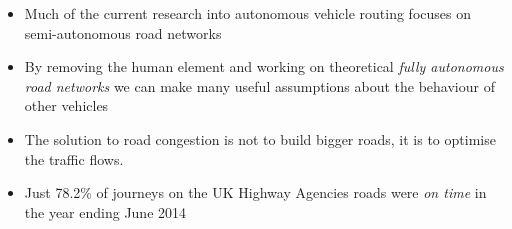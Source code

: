 \documentclass{beamer} \usepackage{pgfpages} \setbeamertemplate{bibliography item}{\insertbiblabel}
\begin{document}
\begin{frame}
    \begin{itemize}
        \item Much of the current research into autonomous vehicle routing focuses on semi-autonomous road networks
        \item By removing the human element and working on theoretical \textit{fully autonomous road networks} we can make many useful assumptions about the behaviour of other vehicles
        \item The solution to road congestion is not to build bigger roads, it is to optimise the traffic flows.
        \item Just 78.2\% of journeys on the UK Highway Agencies roads were \textit{on time} in the year ending June 2014 \cite{measures02079443095ReliabilityJourneysHighways}
    \end{itemize}
\end{frame}
\end{document}

